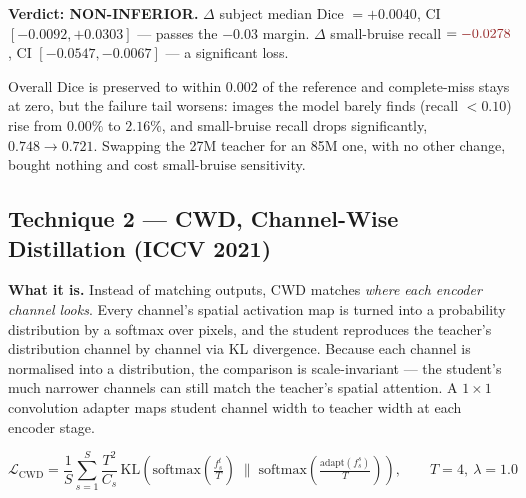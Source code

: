 \documentclass[11pt]{article}
\newcommand{\lose}[1]{\textcolor{losered}{#1}}
\begin{document}
\textbf{Verdict: NON-INFERIOR.}
$\Delta$ subject median Dice $=+0.0040$, CI $[-0.0092,+0.0303]$ --- passes the $-0.03$ margin.
$\Delta$ small-bruise recall $=\lose{-0.0278}$, CI $[-0.0547,-0.0067]$ --- a significant loss.

Overall Dice is preserved to within $0.002$ of the reference and complete-miss stays at zero, but
the failure tail worsens: images the model barely finds (recall $<0.10$) rise from $0.00\%$ to
$2.16\%$, and small-bruise recall drops significantly, $0.748\to0.721$. Swapping the 27M teacher
for an 85M one, with no other change, bought nothing and cost small-bruise sensitivity.

\subsection{Technique 2 --- CWD, Channel-Wise Distillation (ICCV 2021)}

\textbf{What it is.} Instead of matching outputs, CWD matches \emph{where each encoder channel
looks}. Every channel's spatial activation map is turned into a probability distribution by a
softmax over pixels, and the student reproduces the teacher's distribution channel by channel via
KL divergence. Because each channel is normalised into a distribution, the comparison is
scale-invariant --- the student's much narrower channels can still match the teacher's spatial
attention. A $1\times1$ convolution adapter maps student channel width to teacher width at each
encoder stage.

\[
  \mathcal{L}_{\mathrm{CWD}}=\frac{1}{S}\sum_{s=1}^{S}\frac{T^2}{C_s}\,
  \mathrm{KL}\!\left(\mathrm{softmax}\!\left(\tfrac{f^t_s}{T}\right)\;\Big\|\;
  \mathrm{softmax}\!\left(\tfrac{\mathrm{adapt}(f^s_s)}{T}\right)\right),\qquad T=4,\ \lambda=1.0
\]
\end{document}
